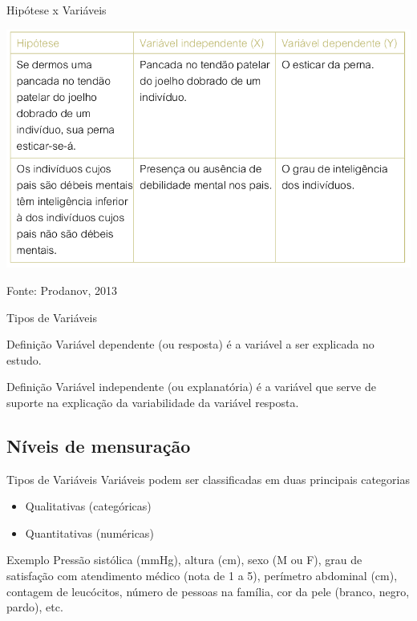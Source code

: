 \documentclass{beamer}
\begin{document}
\begin{frame}{Hipótese x Variáveis}
  \begin{center}
  \includegraphics[height=0.8\textheight]{Hipoteses_variaveis/hipotese_variaveis}
\end{center}

  \vfill
  \scriptsize
  \hfill Fonte: Prodanov, 2013
\end{frame}

\begin{frame}{Tipos de Variáveis}
  \begin{block}{Definição}
    Variável \alert{dependente} (ou resposta) é a variável a ser
    explicada no estudo.
  \end{block}
  \begin{block}{Definição}
    Variável \alert{independente} (ou explanatória) é a variável que
    serve de suporte na explicação da variabilidade da variável
    resposta.
  \end{block}
\end{frame}

\subsection{Níveis de mensuração}

\begin{frame}{Tipos de Variáveis}
Variáveis podem ser classificadas em duas principais categorias
  \begin{itemize}
  \item Qualitativas (categóricas)
  \item Quantitativas (numéricas)
  \end{itemize}
  \begin{exampleblock}{Exemplo}
    Pressão sistólica (mmHg), altura (cm), sexo (M ou F), grau de
    satisfação com atendimento médico (nota de 1 a 5), perímetro
    abdominal (cm), contagem de leucócitos, número de pessoas na
    família, cor da pele (branco, negro, pardo), etc.
  \end{exampleblock}
\end{frame}
\end{document}
